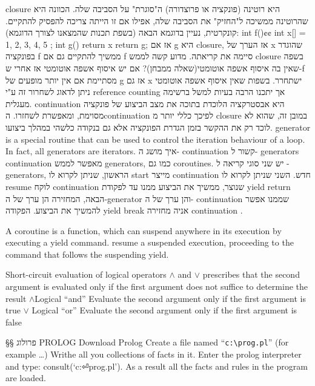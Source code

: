         closure היא רוטינה (פונקציה או פרוצדורה) ה"סוגרת" על הסביבה שלה. הכוונה היא שהרוטינה ממשיכה ל"החזיק" את הסביבה שלה, אפילו אם זו הייתה צריכה להפסיק להתקיים. קונקרטית, נעיין בדוגמא הבאה (בשפת תכנות שהמצאנו לצורך הדוגמא):
        int f(){¢¢
          int x[] = { 1, 2, 3, 4, 5 };
          int g(){ return x }
          return g;
        }
        אז אם g היא closure, אז הערך של x שהוגדר בפונקציה f ממשיך להתקיים גם אם f סיימה את קריאתה.
        מדוע קשה לממש closure בשפה שאין בה איסוף אשפה אוטומטי(שאלה ממבחן)?
        אם יש איסוף אשפה אוטומטי אז אחרי ש-f מסתיימת אם אין יותר מופעים של g אז גם x ישתחרר. בשפות שאין איסוף אשפה אוטומטי ניתן לדאוג לשחרור זה ע"י
        reference counting אך יתכנו הרבה בעיות למשל ברשימה מעגלית.
        continuation היא אבסטרקציה הלוכדת בתוכה את מצב הביצוע של פונקציה מסוימת,
        ומאפשרת לשחזרו. הcontinuation לפיכך כללי יותר מ closure במובן זה, שהוא לא לוכד רק את ההקשר בזמן הגדרת הפונקציה אלא גם בנקודה כלשהי במהלך ביצועו.
        generator is a special routine that can be used to control the iteration behaviour of a loop. In fact, all generators are iterators.
        איך מושג ה- continuation קשור ל- generators
        continuation מאפשר לממש generators, כמו גם coroutines. יש שני סוגי קריאה ל - generators, הראשון, שניתן לקרוא לו start מייצר continuation חדש. השני שניתן לקרוא לו resume לוקח continuation שנוצר, ממשיך את הביצוע ממנו עד לפקודת yield return הבאה, המחזירה הן ערך של ה-generator והן ערך של ה- continuation שממנו אפשר להמשיך את הביצוע. הפקודה yield break אניה מחזירה continuation .

        A coroutine is a function, which can suspend anywhere in its execution by executing a yield command. resume a suspended execution, proceeding to the command that follows the suspending yield.

        Short-circuit evaluation of logical operators $∧$ and $∨$ prescribes that
        the second argument is evaluated only if the first argument does not
        suffice to determine the result
        $∧$Logical “and” Evaluate the second argument only if the first
        argument is true
        $∨$ Logical “or” Evaluate the second argument only if the first
        argument is false

        §§ פרולוג
        PROLOG
        Download Prolog
        Create a file named “\verb+c:\prog.pl+” (for example …)
        Writhe all you collections of facts in it.
        Enter the prolog interpreter and type: consult(‘c:⏎prog.pl’).
        As a result all the facts and rules in the program are loaded.


